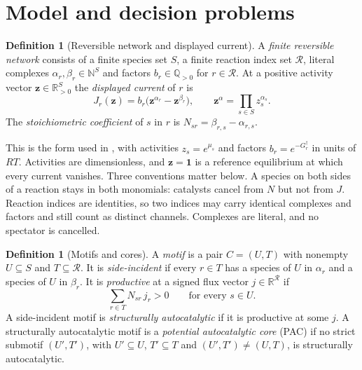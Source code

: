 \documentclass[11pt,a4paper]{article}
\theoremstyle{plain}
\theoremstyle{definition}
\newtheorem{definition}[theorem]{Definition}
\theoremstyle{remark}
\newcommand{\R}{\mathbb{R}}
\newcommand{\Q}{\mathbb{Q}}
\newcommand{\N}{\mathbb{N}}
\newcommand{\act}{\boldsymbol z}
\newcommand{\one}{\mathbf 1}
\begin{document}
\section{Model and decision problems}\label{sec:model}

\begin{definition}[Reversible network and displayed current]\label{def:network}
A \emph{finite reversible network} consists of a finite species set $S$, a finite reaction index set $\mathcal R$, literal complexes $\alpha_r,\beta_r\in\N^S$ and factors $b_r\in\Q_{>0}$ for $r\in\mathcal R$. At a positive activity vector $\act\in\R_{>0}^S$ the \emph{displayed current} of $r$ is
\begin{equation}\label{eq:current}
 J_r(\act)=b_r\bigl(\act^{\alpha_r}-\act^{\beta_r}\bigr),\qquad \act^{\alpha}=\prod_{s\in S}z_s^{\alpha_s}.
\end{equation}
The \emph{stoichiometric coefficient} of $s$ in $r$ is $N_{sr}=\beta_{r,s}-\alpha_{r,s}$.
\end{definition}

This is the form used in \citep{kosc2025}, with activities $z_s=e^{\mu_s}$ and factors $b_r=e^{-G_r^\dagger}$ in units of $RT$. Activities are dimensionless, and $\act=\one$ is a reference equilibrium at which every current vanishes. Three conventions matter below. A species on both sides of a reaction stays in both monomials: catalysts cancel from $N$ but not from $J$. Reaction indices are identities, so two indices may carry identical complexes and factors and still count as distinct channels. Complexes are literal, and no spectator is cancelled.

\begin{definition}[Motifs and cores]\label{def:pac}
A \emph{motif} is a pair $C=(U,T)$ with nonempty $U\subseteq S$ and $T\subseteq\mathcal R$. It is \emph{side-incident} if every $r\in T$ has a species of $U$ in $\alpha_r$ and a species of $U$ in $\beta_r$. It is \emph{productive} at a signed flux vector $j\in\R^{\mathcal R}$ if
\begin{equation}\label{eq:production}
 \sum_{r\in T}N_{sr}\,j_r>0\qquad\text{for every }s\in U.
\end{equation}
A side-incident motif is \emph{structurally autocatalytic} if it is productive at some $j$. A structurally autocatalytic motif is a \emph{potential autocatalytic core} (PAC) if no strict submotif $(U',T')$, with $U'\subseteq U$, $T'\subseteq T$ and $(U',T')\ne(U,T)$, is structurally autocatalytic.
\end{definition}
\end{document}
